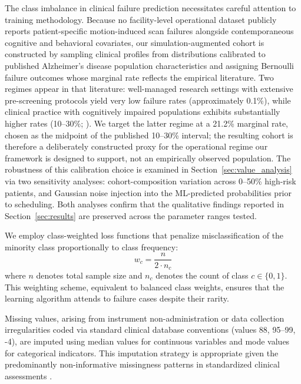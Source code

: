 \documentclass[11pt,a4paper]{article}
\begin{document}
The class imbalance in clinical failure prediction necessitates careful attention to training methodology. Because no facility-level operational dataset publicly reports patient-specific motion-induced scan failures alongside contemporaneous cognitive and behavioral covariates, our simulation-augmented cohort is constructed by sampling clinical profiles from distributions calibrated to published Alzheimer's disease population characteristics and assigning Bernoulli failure outcomes whose marginal rate reflects the empirical literature. Two regimes appear in that literature: well-managed research settings with extensive pre-screening protocols yield very low failure rates (approximately 0.1\%), while clinical practice with cognitively impaired populations exhibits substantially higher rates (10--30\%; \citealp{porembka2025disparities}). We target the latter regime at a 21.2\% marginal rate, chosen as the midpoint of the published 10--30\% interval; the resulting cohort is therefore a deliberately constructed proxy for the operational regime our framework is designed to support, not an empirically observed population. The robustness of this calibration choice is examined in Section~\ref{sec:value_analysis} via two sensitivity analyses: cohort-composition variation across 0--50\% high-risk patients, and Gaussian noise injection into the ML-predicted probabilities prior to scheduling. Both analyses confirm that the qualitative findings reported in Section~\ref{sec:results} are preserved across the parameter ranges tested.

We employ class-weighted loss functions that penalize misclassification of the minority class proportionally to class frequency:
\begin{equation}
w_c = \frac{n}{2 \cdot n_c}
\end{equation}
where $n$ denotes total sample size and $n_c$ denotes the count of class $c \in \{0, 1\}$. This weighting scheme, equivalent to balanced class weights, ensures that the learning algorithm attends to failure cases despite their rarity.

Missing values, arising from instrument non-administration or data collection irregularities coded via standard clinical database conventions (values 88, 95--99, -4), are imputed using median values for continuous variables and mode values for categorical indicators. This imputation strategy is appropriate given the predominantly non-informative missingness patterns in standardized clinical assessments \citep{sterne2009multiple}.
\end{document}
